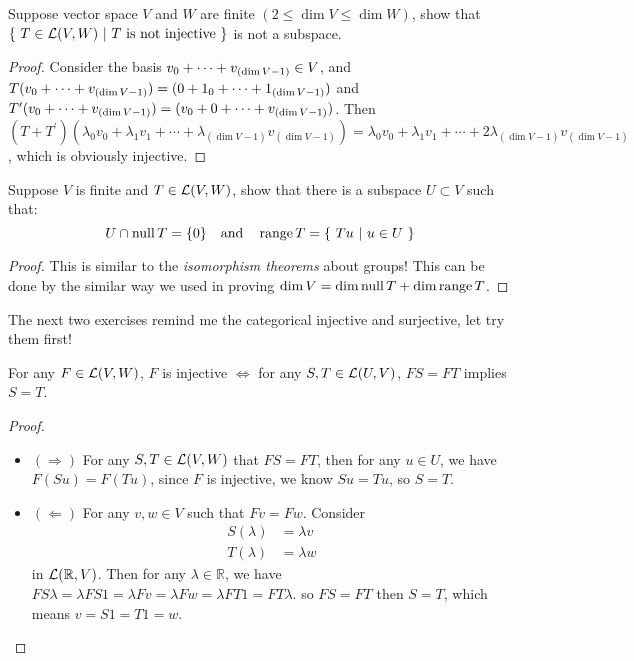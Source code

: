 \documentclass[../main.tex]{subfiles}
\begin{document}
\setcounter{exercise}{6}
\begin{exercise}
  Suppose vector space $V$ and $W$ are finite $(2 \le \dim V \le \dim W)$,
  show that $\set{T \in \LT(V, W)}{T \text{ is not injective}}$ is not a subspace.
\end{exercise}
\begin{proof}
  Consider the basis $\join[+]{v}{(\dim V - 1)} \in V$,
  and $T(\join[+]{v}{(\dim V - 1)}) = (0 + \join[+]{1}{(\dim V - 1)})$
  and $T^\prime(\join[+]{v}{(\dim V - 1)}) = (v_0 +  0 + \cdots + v_{(\dim V - 1)})$.
  Then
  $(T + T^\prime)(\lambda_0v_0 + \lambda_1v_1 + \cdots + \lambda_{(\dim V - 1)}v_{(\dim V - 1)}) = \lambda_0v_0 + \lambda_1v_1 + \cdots + 2\lambda_{(\dim V - 1)}v_{(\dim V - 1)}$,
  which is obviously injective.
\end{proof}

\setcounter{exercise}{10}
\begin{exercise}
  Suppose $V$ is finite and $T \in \LT(V, W)$, show that there is a subspace $U \subset V$ such that:
  \[
  U \cap \nullv T = \0 \quad \text{and} \quad \rangev T = \set{Tu}{u \in U}
  \]
\end{exercise}
\begin{proof}
  This is similar to the \textit{isomorphism theorems} about groups!
  This can be done by the similar way we used in proving $\dim V = \dim \nullv T + \dim \rangev T$.
\end{proof}

The next two exercises remind me the categorical injective and surjective, let try them first!

\begin{exercise*}
  For any $F \in \LT(V, W)$, $F$ is injective $\iff$ for any $S, T \in \LT(U, V)$, $FS = FT$ implies $S = T$.
\end{exercise*}
\begin{proof}
  ~
  \begin{itemize}
    \item $(\Rightarrow)$ For any $S, T \in \LT(V, W)$ that $FS = FT$, then for any $u \in U$,
          we have $F(Su) = F(Tu)$, since $F$ is injective, we know $Su = Tu$, so $S = T$.
    \item $(\Leftarrow)$ For any $v, w \in V$ such that $Fv = Fw$. Consider
          \begin{align*}
            S(\lambda) &= \lambda v \\
            T(\lambda) &= \lambda w
          \end{align*}
          in $\LT(\mathbb{R}, V)$.
          Then for any $\lambda \in \mathbb{R}$, we have $FS\lambda = \lambda FS1 = \lambda Fv = \lambda Fw = \lambda FT1 = FT\lambda$.
          so $FS = FT$ then $S = T$, which means $v = S1 = T1 = w$.
  \end{itemize}
\end{proof}
\end{document}
